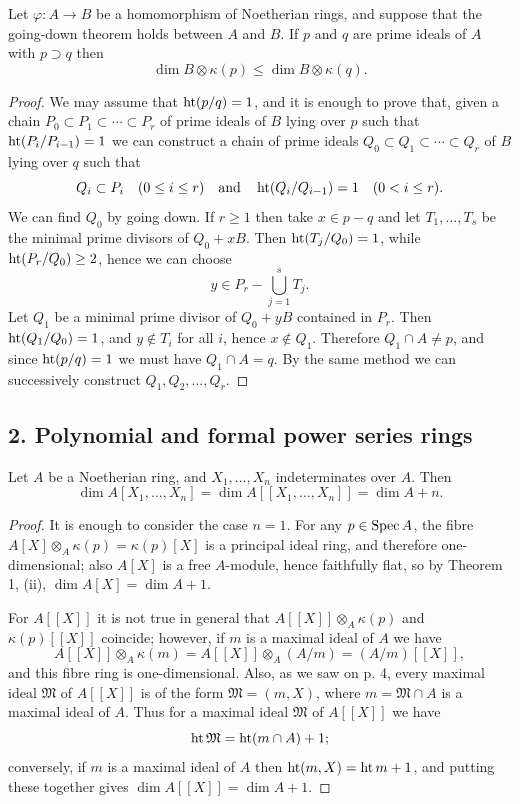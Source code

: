 \begin{theorem}\label{thm:15.3}
Let $\varphi\colon A \to B$ be a homomorphism of Noetherian rings, and
suppose that the going-down theorem holds between $A$ and $B$. If $p$ and $q$
are prime ideals of $A$ with $p \supset q$ then
\[
  \dim B \otimes \kappa(p) \le \dim B \otimes \kappa(q).
\]
\end{theorem}

\begin{proof}
We may assume that $\operatorname{ht}(p/q) = 1$, and it is enough to prove that,
given a chain $P_0 \subset P_1 \subset \cdots \subset P_r$ of prime ideals of $B$ lying over $p$ such that
$\operatorname{ht}(P_i/P_{i-1}) = 1$ we can construct a chain of prime ideals $Q_0 \subset Q_1 \subset \cdots \subset Q_r$
of $B$ lying over $q$ such that
\[
  Q_i \subset P_i \quad (0 \le i \le r) \quad \text{and} \quad \operatorname{ht}(Q_i/Q_{i-1}) = 1 \quad (0 < i \le r).
\]
We can find $Q_0$ by going down. If $r \ge 1$ then take $x \in p - q$ and let $T_1, \ldots, T_s$
be the minimal prime divisors of $Q_0 + xB$. Then $\operatorname{ht}(T_j/Q_0) = 1$, while
$\operatorname{ht}(P_r/Q_0) \ge 2$, hence we can choose
\[
  y \in P_r - \bigcup_{j=1}^{s} T_j.
\]
Let $Q_1$ be a minimal prime divisor of $Q_0 + yB$ contained in $P_r$. Then
$\operatorname{ht}(Q_1/Q_0) = 1$, and $y \notin T_i$ for all $i$, hence $x \notin Q_1$.
Therefore $Q_1 \cap A \neq p$, and since $\operatorname{ht}(p/q) = 1$ we must have $Q_1 \cap A = q$. By
the same method we can successively construct $Q_1, Q_2, \ldots, Q_r$.
\end{proof}

\subsection*{2. Polynomial and formal power series rings}

\begin{theorem}\label{thm:15.4}
Let $A$ be a Noetherian ring, and $X_1, \ldots, X_n$ indeterminates
over $A$. Then
\[
  \dim A[X_1, \ldots, X_n] = \dim A[[X_1, \ldots, X_n]] = \dim A + n.
\]
\end{theorem}

\begin{proof}
It is enough to consider the case $n = 1$. For any $p \in \operatorname{Spec} A$, the
fibre $A[X] \otimes_A \kappa(p) = \kappa(p)[X]$ is a principal ideal ring, and therefore one-
dimensional; also $A[X]$ is a free $A$-module, hence faithfully flat, so by
Theorem 1, (ii), $\dim A[X] = \dim A + 1$.

For $A[[X]]$ it is not true in general that $A[[X]] \otimes_A \kappa(p)$ and $\kappa(p)[[X]]$
coincide; however, if $m$ is a maximal ideal of $A$ we have
\[
  A[[X]] \otimes_A \kappa(m) = A[[X]] \otimes_A (A/m) = (A/m)[[X]],
\]
and this fibre ring is one-dimensional. Also, as we saw on p. 4, every
maximal ideal $\mathfrak{M}$ of $A[[X]]$ is of the form $\mathfrak{M} = (m, X)$, where $m = \mathfrak{M} \cap A$
is a maximal ideal of $A$. Thus for a maximal ideal $\mathfrak{M}$ of $A[[X]]$ we have
\[
  \operatorname{ht} \mathfrak{M} = \operatorname{ht}(m \cap A) + 1;
\]
conversely, if $m$ is a maximal ideal of $A$ then $\operatorname{ht}(m, X) = \operatorname{ht} m + 1$, and
putting these together gives $\dim A[[X]] = \dim A + 1$.
\end{proof}

